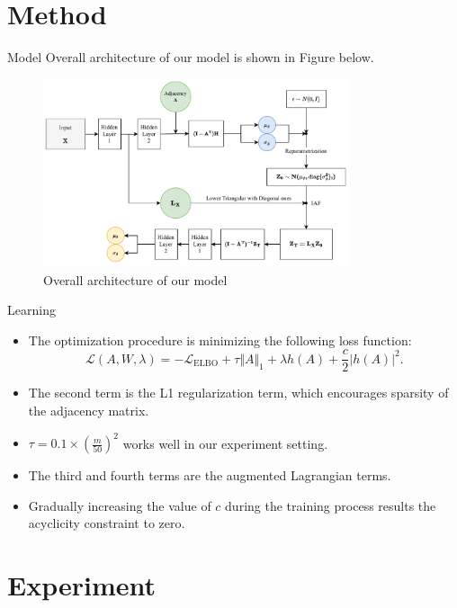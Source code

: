 \documentclass{beamer}
\begin{document}
\section{Method}

\begin{frame}{Model}
    Overall architecture of our model is shown in Figure below.
    \begin{figure}
        \centering
        \includegraphics[width=0.8\textwidth]{fig/model.pdf}
        \caption{Overall architecture of our model}
        \label{fig:architecture}
    \end{figure}
\end{frame}

\begin{frame}{Learning}
    \begin{itemize}
        \item The optimization procedure is minimizing the following loss function:
        \begin{equation*}
            \mathcal{L}(A, W, \lambda) =-\mathcal{L}_{\mathrm{ELBO}} + \tau \Vert A \Vert_1 + \lambda h(A) + \frac{c}{2} |h(A)|^2.
        \end{equation*}
        \item The second term is the L1 regularization term, which encourages sparsity of the adjacency matrix.
        \item $\tau=0.1 \times (\frac{m}{50})^2$ works well in our experiment setting.
        \item The third and fourth terms are the augmented Lagrangian terms.
        \item Gradually increasing the value of $c$ during the training process results the acyclicity constraint to zero.
    \end{itemize}
\end{frame}
            

\section{Experiment}
\end{document}
